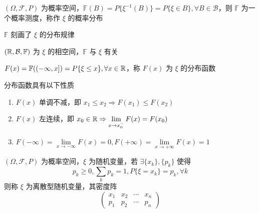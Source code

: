 \documentclass[12pt,a4paper]{amsart}
\begin{document}
\begin{definition}[分布]
    $(\Omega, \mathcal{F}, P)$ 为概率空间，$\mathbb{F}(B) = P\{\xi^{-1}(B)\} = P\{\xi\in B\}, \forall B\in\mathcal{B}$，则 $\mathbb{F}$ 为一个概率测度，称作 $\xi$ 的概率分布
\end{definition}

$\mathbb{F}$ 刻画了 $\xi$ 的分布规律

\begin{definition}[相空间]
    $(\mathbb{R}, \mathcal{B}, \mathbb{F})$ 为 $\xi$ 的相空间，$\mathbb{F}$ 与 $\xi$ 有关
\end{definition}

\begin{definition}[分布函数]
    $F(x) = \mathbb{F}((-\infty, x]) = P\{\xi\leq x\}, \forall x\in\mathbb{R}$，称 $F(x)$ 为 $\xi$ 的分布函数
\end{definition}

分布函数具有以下性质

\begin{proposition}
    \begin{enumerate}
        \item $F(x)$ 单调不减，即 $x_1\leq x_2 \Rightarrow F(x_1)\leq F(x_2)$   
        \item $F(x)$ 左连续，即 $x_0\in\mathbb{R} \Rightarrow \lim\limits_{x\to x_0^-}F(x)=F(x_0)$
        \item $F(-\infty) = \lim\limits_{x\to-\infty}F(x)=0, F(+\infty) = \lim\limits_{x\to+\infty}F(x)=1$
    \end{enumerate}
\end{proposition}

\begin{definition}[离散型]
    $(\Omega, \mathcal{F}, P)$ 为概率空间，$\xi$ 为随机变量，若 $\exists \{x_k\}, \{p_k\}$ 使得
    \begin{equation}
        p_k \geq 0, \sum_{k}p_k = 1, P\{\xi = x_k\} = p_k, \forall k
    \end{equation}
    则称 $\xi$ 为离散型随机变量，其密度阵
    \begin{equation}
        \begin{pmatrix}
            x_1 & x_2 & \cdots & x_n \\
            p_1 & p_2 & \cdots & p_n
        \end{pmatrix}
    \end{equation}
\end{definition}



\appendix



{\footnotesize}
\end{document}
